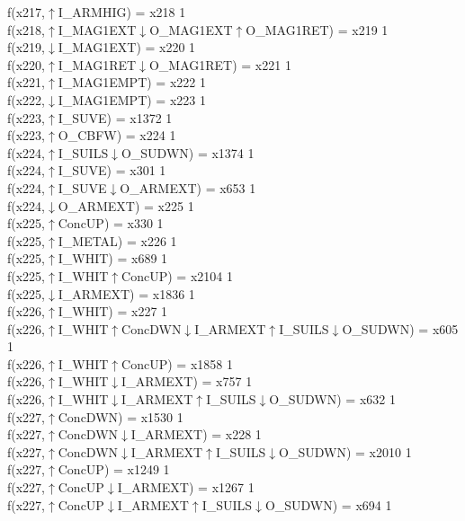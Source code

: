 f(x217,$\uparrow$I\_ARMHIG) = x218 {1} \\
f(x218,$\uparrow$I\_MAG1EXT$\downarrow$O\_MAG1EXT$\uparrow$O\_MAG1RET) = x219 {1} \\
f(x219,$\downarrow$I\_MAG1EXT) = x220 {1} \\
f(x220,$\uparrow$I\_MAG1RET$\downarrow$O\_MAG1RET) = x221 {1} \\
f(x221,$\uparrow$I\_MAG1EMPT) = x222 {1} \\
f(x222,$\downarrow$I\_MAG1EMPT) = x223 {1} \\
f(x223,$\uparrow$I\_SUVE) = x1372 {1} \\
f(x223,$\uparrow$O\_CBFW) = x224 {1} \\
f(x224,$\uparrow$I\_SUILS$\downarrow$O\_SUDWN) = x1374 {1} \\
f(x224,$\uparrow$I\_SUVE) = x301 {1} \\
f(x224,$\uparrow$I\_SUVE$\downarrow$O\_ARMEXT) = x653 {1} \\
f(x224,$\downarrow$O\_ARMEXT) = x225 {1} \\
f(x225,$\uparrow$ConcUP) = x330 {1} \\
f(x225,$\uparrow$I\_METAL) = x226 {1} \\
f(x225,$\uparrow$I\_WHIT) = x689 {1} \\
f(x225,$\uparrow$I\_WHIT$\uparrow$ConcUP) = x2104 {1} \\
f(x225,$\downarrow$I\_ARMEXT) = x1836 {1} \\
f(x226,$\uparrow$I\_WHIT) = x227 {1} \\
f(x226,$\uparrow$I\_WHIT$\uparrow$ConcDWN$\downarrow$I\_ARMEXT$\uparrow$I\_SUILS$\downarrow$O\_SUDWN) = x605 {1} \\
f(x226,$\uparrow$I\_WHIT$\uparrow$ConcUP) = x1858 {1} \\
f(x226,$\uparrow$I\_WHIT$\downarrow$I\_ARMEXT) = x757 {1} \\
f(x226,$\uparrow$I\_WHIT$\downarrow$I\_ARMEXT$\uparrow$I\_SUILS$\downarrow$O\_SUDWN) = x632 {1} \\
f(x227,$\uparrow$ConcDWN) = x1530 {1} \\
f(x227,$\uparrow$ConcDWN$\downarrow$I\_ARMEXT) = x228 {1} \\
f(x227,$\uparrow$ConcDWN$\downarrow$I\_ARMEXT$\uparrow$I\_SUILS$\downarrow$O\_SUDWN) = x2010 {1} \\
f(x227,$\uparrow$ConcUP) = x1249 {1} \\
f(x227,$\uparrow$ConcUP$\downarrow$I\_ARMEXT) = x1267 {1} \\
f(x227,$\uparrow$ConcUP$\downarrow$I\_ARMEXT$\uparrow$I\_SUILS$\downarrow$O\_SUDWN) = x694 {1} \\

